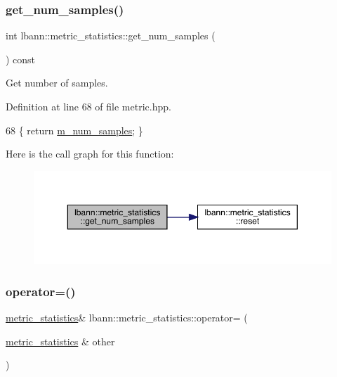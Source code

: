 \subsubsection{\texorpdfstring{get\+\_\+num\+\_\+samples()}{get\_num\_samples()}}
{\footnotesize\ttfamily int lbann\+::metric\+\_\+statistics\+::get\+\_\+num\+\_\+samples (\begin{DoxyParamCaption}{ }\end{DoxyParamCaption}) const\hspace{0.3cm}{\ttfamily [inline]}}

Get number of samples. 

Definition at line 68 of file metric.\+hpp.


\begin{DoxyCode}
68 \{ \textcolor{keywordflow}{return} \hyperlink{structlbann_1_1metric__statistics_a6633bf91863b7e2327563ac93a9783f7}{m\_num\_samples}; \}
\end{DoxyCode}
Here is the call graph for this function\+:\nopagebreak
\begin{figure}[H]
\begin{center}
\leavevmode
\includegraphics[width=350pt]{structlbann_1_1metric__statistics_a24e7c8d8ecc2a02279d73b908fc97133_cgraph}
\end{center}
\end{figure}
\mbox{\label{structlbann_1_1metric__statistics_a4d9ae608667c58eda58be3f4a237122d}} 
\subsubsection{\texorpdfstring{operator=()}{operator=()}\hspace{0.1cm}{\footnotesize\ttfamily [1/2]}}
{\footnotesize\ttfamily \hyperlink{structlbann_1_1metric__statistics}{metric\+\_\+statistics}\& lbann\+::metric\+\_\+statistics\+::operator= (\begin{DoxyParamCaption}\item[{\hyperlink{structlbann_1_1metric__statistics}{metric\+\_\+statistics} \&}]{other }\end{DoxyParamCaption})\hspace{0.3cm}{\ttfamily [default]}}

